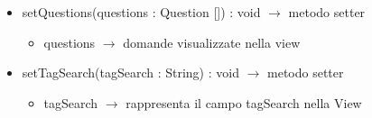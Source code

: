 \begin{description}
\begin{itemize}
	\item setQuestions(questions : Question []) : void $\rightarrow$ metodo setter\begin{itemize}
		\item questions $\rightarrow$ domande visualizzate nella view
	\end{itemize}
	
	\item setTagSearch(tagSearch : String) : void $\rightarrow$ metodo setter\begin{itemize}
		\item tagSearch $\rightarrow$ rappresenta il campo tagSearch nella View
	\end{itemize}
	
\end{itemize}

\end{description}

